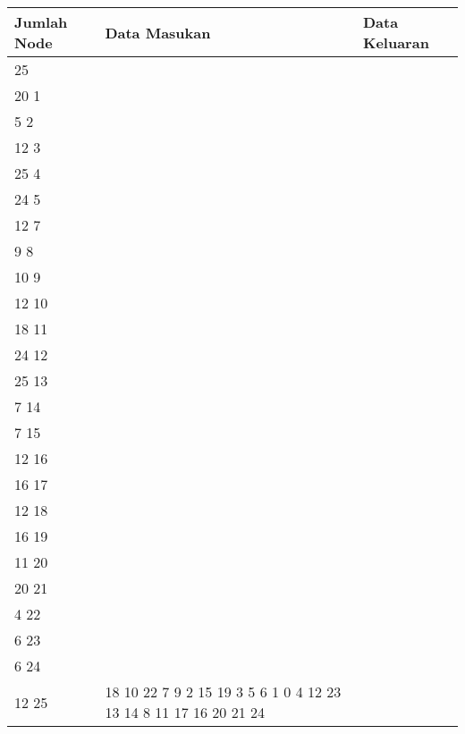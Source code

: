 	\begin{longtable}[Ht]{| p{} | p{} | p{} |}
		\hline
		Jumlah Node & Data Masukan                                                                                                                                                                                                                          & Data Keluaran                                                          \\ \hline
	25          & \begin{tabular}[c]{@{}l@{}}25\\ 20 1\\ 5 2\\ 12 3\\ 25 4\\ 24 5\\ 12 7\\ 9 8\\ 10 9\\ 12 10\\ 18 11\\ 24 12\\ 25 13\\ 7 14\\ 7 15\\ 12 16\\ 16 17\\ 12 18\\ 16 19\\ 11 20\\ 20 21\\ 4 22\\ 6 23\\ 6 24\\ 12 25\end{tabular}           & 18 10 22 7 9 2 15 19 3 5 6 1 0 4 12 23 13 14 8 11 17 16 20 21 24       \\ \hline
	\end{longtable}
	\pagebreak
